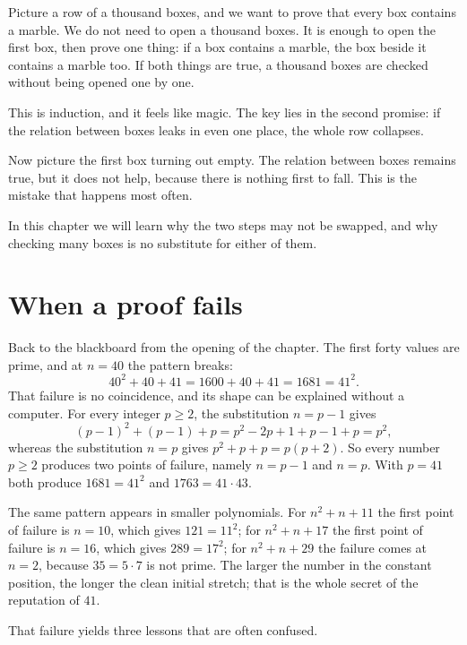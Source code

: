 \begin{untukanak}
Picture a row of a thousand boxes, and we want to prove that every box contains
a marble. We do not need to open a thousand boxes. It is enough to open the first box, then prove
one thing: if a box contains a marble, the box beside it contains a marble too.
If both things are true, a thousand boxes are checked without being opened one by one.

This is induction, and it feels like magic. The key lies in the second promise: if the relation
between boxes leaks in even one place, the whole row collapses.

Now picture the first box turning out empty. The relation between boxes remains true, but
it does not help, because there is nothing first to fall. This is the mistake that
happens most often.

In this chapter we will learn why the two steps may not be swapped, and why
checking many boxes is no substitute for either of them.
\end{untukanak}

\section{When a proof fails}

Back to the blackboard from the opening of the chapter. The first forty values are prime, and at
$n = 40$ the pattern breaks:
\[
  40^{2} + 40 + 41 = 1600 + 40 + 41 = 1681 = 41^{2}.
\]
That failure is no coincidence, and its shape can be explained without a computer. For
every integer $p \geq 2$, the substitution $n = p-1$ gives
\[
  (p-1)^{2} + (p-1) + p = p^{2} - 2p + 1 + p - 1 + p = p^{2},
\]
whereas the substitution $n = p$ gives $p^{2} + p + p = p(p+2)$. So every number
$p \geq 2$ produces two points of failure, namely $n = p-1$ and $n = p$. With $p = 41$
both produce $1681 = 41^{2}$ and $1763 = 41 \cdot 43$.

The same pattern appears in smaller polynomials. For $n^{2}+n+11$ the first point of failure
is $n = 10$, which gives $121 = 11^{2}$; for $n^{2}+n+17$ the first point of failure
is $n = 16$, which gives $289 = 17^{2}$; for $n^{2}+n+29$ the failure comes at $n = 2$,
because $35 = 5 \cdot 7$ is not prime. The larger the number in the constant position,
the longer the clean initial stretch; that is the whole secret of the reputation of $41$.

That failure yields three lessons that are often confused.

